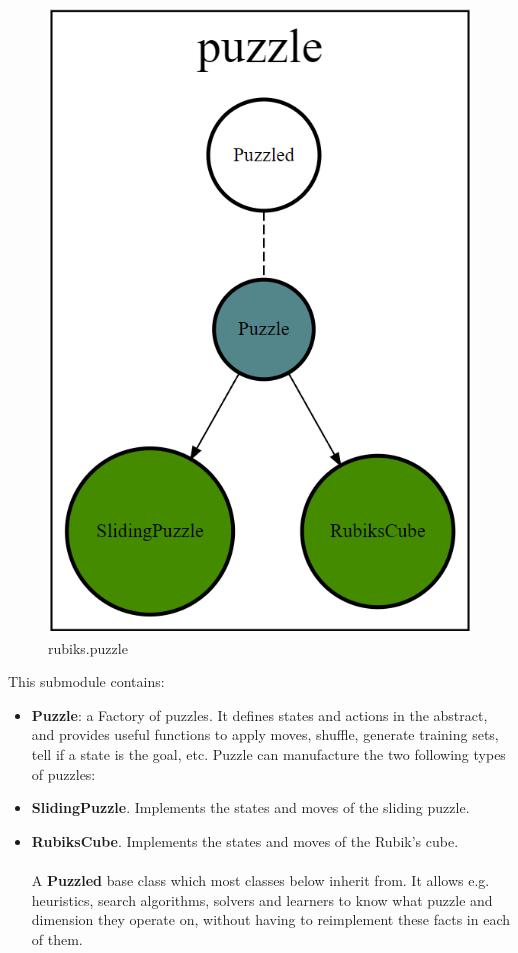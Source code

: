 \begin{figure}[H]
\centering
\includegraphics[scale=0.22]{./Figures/codebasepuzzle}
\caption[Codebase]{rubiks.puzzle}
\label{fig:Codebasepuzzle}
\end{figure}
This submodule contains:
\begin{itemize}
\item \textbf{Puzzle}: a Factory of puzzles. It defines states and actions in the abstract, and provides useful functions to apply moves, shuffle, generate training sets, tell if a state is the goal, etc. Puzzle can manufacture the two following types of puzzles:
\item \textbf{SlidingPuzzle}. Implements the states and moves of the sliding puzzle.
\item \textbf{RubiksCube}. Implements the states and moves of the Rubik's cube.
\\
\\
A \textbf{Puzzled} base class which most classes below inherit from. It allows e.g. heuristics, search algorithms, solvers and learners to know what puzzle and dimension they operate on, without having to reimplement these facts in each of them.
\end{itemize}

